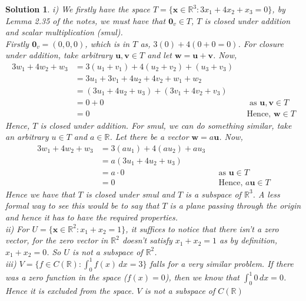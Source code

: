 \documentclass{article}
\newcommand{\R}{\mathbb{R}}
\renewcommand{\vec}[1]{\boldsymbol{\mathbf{#1}}}
\newtheorem{solution}{Solution}
\begin{document}
\begin{solution}
  i) We firstly have the space $T = \{\vec x \in \R^3 : 3x_1 + 4x_2 + x_3 = 0\}$, by Lemma 2.35 of the notes, we must have that $\vec 0_v \in T$, $T$ is closed under addition and scalar multiplication (smul).\\
  Firstly $\vec 0_v = (0, 0, 0)$, which is in $T$ as, $\displaystyle{3(0) + 4(0 + 0 = 0)}$. For closure under addition, take arbitrary $\vec u, \vec v \in T$ and let $\vec w = \vec u + \vec v$. Now,
  \begin{align*}
    3w_1 + 4w_2 + w_3 &= 3(u_1 + v_1) + 4(u_2 + v_2) + (u_3 + v_3)\\
    &= 3u_1 + 3v_1 + 4u_2 + 4v_2 + w_1 + w_2\\
    &= (3u_1 + 4u_2 + u_3) + (3v_1 + 4v_2 + v_3)\\
    &= 0 + 0 && \text{ as $\vec u, \vec v \in T$}\\
    &= 0 && \text{Hence, $\vec w \in T$}
  \end{align*}
  Hence, $T$ is closed under addition. For smul, we can do something similar, take an arbitrary $u \in T$ and $a \in \R$. Let there be a vector $\vec w = a\vec u$. Now,
  \begin{align*}
    3w_1 + 4w_2 + w_3 &= 3(au_1) + 4(au_2) + au_3\\
    &= a(3u_1 + 4u_2 + u_3)\\
    &= a \cdot 0 && \text{as $\vec u \in T$}\\
    &= 0 && \text{Hence, $a\vec u \in T$}
  \end{align*}
  Hence we have that $T$ is closed under smul and $T$ is a subspace of $\R^3$. A less formal way to see this would be to say that $T$ is a plane passing through the origin and hence it has to have the required properties.\\

  \noindent
  ii) For $\displaystyle{U = \{\vec x \in \R^2 : x_1 + x_2 = 1\}}$, it suffices to notice that there isn't a zero vector, for the zero vector in $\R^2$ doesn't satisfy $x_1 + x_2 = 1$ as by definition, $x_1 + x_2 = 0$. So $U$ is not a subspace of $\R^2$.\\

  \noindent
  iii) $V = \{ f \in C(\R) : \int_0^1 f(x)\,dx = 3 \}$ falls for a very similar problem. If there was a zero function in the space ($f(x) = 0$), then we know that $\displaystyle{\int_0^1 0\,dx = 0}$. Hence it is excluded from the space. $V$ is not a subspace of $C(\R)$\\


\end{solution}
\end{document}
